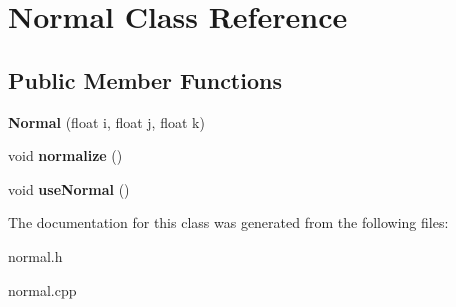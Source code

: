 \hypertarget{classNormal}{\section{Normal Class Reference}
\label{classNormal}
}
\subsection*{Public Member Functions}
\begin{DoxyCompactItemize}
\item 
\hypertarget{classNormal_aea817fa6401166252c899d5e7a86dd0e}{{\bfseries Normal} (float i, float j, float k)}\label{classNormal_aea817fa6401166252c899d5e7a86dd0e}

\item 
\hypertarget{classNormal_a1616e612bec600893855682d971406b9}{void {\bfseries normalize} ()}\label{classNormal_a1616e612bec600893855682d971406b9}

\item 
\hypertarget{classNormal_a73aedd5b87467b934da29e54e653b309}{void {\bfseries use\-Normal} ()}\label{classNormal_a73aedd5b87467b934da29e54e653b309}

\end{DoxyCompactItemize}


The documentation for this class was generated from the following files\-:\begin{DoxyCompactItemize}
\item 
normal.\-h\item 
normal.\-cpp\end{DoxyCompactItemize}
